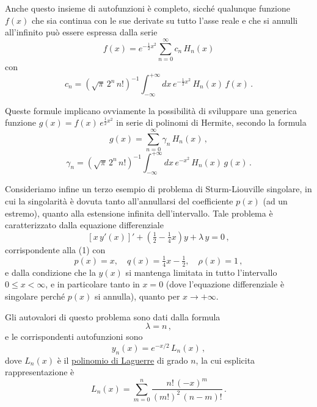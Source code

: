 \documentclass[11pt, a4paper]{book}
\numberwithin{equation}{section}
\begin{document}
Anche questo insieme di autofunzioni è completo, sicché
qualunque funzione $f(x)$ che sia continua con le sue derivate su tutto
l'asse reale e che si annulli all'infinito può essere espressa dalla
serie
\begin{equation}
f(x) = e^{-\frac{1}{2}x^2} \sum_{n=0}^{\infty} c_n\, H_n(x) \tag{39}
\end{equation}
con
\begin{equation}
c_n = \left(\sqrt{\pi}\, 2^n\, n!\right)^{-1} \int_{-\infty}^{+\infty} dx\, e^{-\frac{1}{2}x^2}\, H_n(x)\, f(x) \,. \tag{40}
\end{equation}


Queste formule implicano ovviamente la possibilità di sviluppare
una generica funzione $g(x) = f(x)\, e^{\frac{1}{2}x^2}$ in serie di polinomi di Hermite, secondo la formula
\begin{equation}
g(x) = \sum_{n=0}^{\infty} \gamma_n\, H_n(x) \,, \tag{41}
\end{equation}
\begin{equation}
\gamma_n = \left(\sqrt{\pi}\, 2^n\, n!\right)^{-1} \int_{-\infty}^{+\infty} dx\, e^{-x^2}\, H_n(x)\, g(x) \,. \tag{42}
\end{equation}

Consideriamo infine un terzo esempio di problema di Sturm-Liouville singolare, in cui la singolarità è dovuta tanto all'annullarsi del coefficiente $p(x)$ (ad un estremo), quanto alla estensione infinita dell'intervallo. Tale problema è caratterizzato dalla equazione differenziale
\begin{equation}
\left[x\, y'(x)\right]' + \left(\tfrac{1}{2} - \tfrac{1}{4}x\right) y + \lambda\, y = 0 \,, \tag{42}
\end{equation}
corrispondente alla (1) con
\begin{equation}
p(x) = x, \quad q(x) = \tfrac{1}{4}x - \tfrac{1}{2}, \quad \rho(x) = 1 \,, \tag{43}
\end{equation}
e dalla condizione che la $y(x)$ si mantenga limitata in tutto l'intervallo
$0 \leq x < \infty$, e in particolare tanto in $x=0$ (dove l'equazione differenziale è singolare perché $p(x)$ si annulla), quanto per $x \to +\infty$.

Gli autovalori di questo problema sono dati dalla formula
\begin{equation}
\lambda = n \,, \tag{44}
\end{equation}
e le corrispondenti autofunzioni sono
\begin{equation}
y_n(x) = e^{-x/2}\, L_n(x) \,, \tag{45}
\end{equation}
dove $L_n(x)$ è il \underline{polinomio di Laguerre} di grado $n$, la cui esplicita
rappresentazione è
\begin{equation}
L_n(x) = \sum_{m=0}^{n} \frac{n!\,(-x)^m}{(m!)^2\,(n-m)!} \,. \tag{46}
\end{equation}
\end{document}
